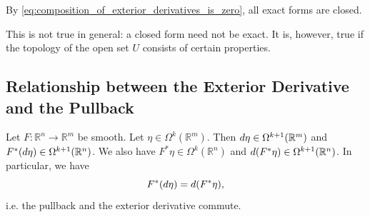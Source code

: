 \documentclass[notoc,notitlepage]{tufte-book}
\begin{document}
\begin{note}
  By \cref{eq:composition_of_exterior_derivatives_is_zero}, all exact forms are closed.

  This is not true in general: a closed form need not be exact. It is, however, true if
  the topology of the open set $U$ consists of certain properties.
\end{note}

\subsection{Relationship between the Exterior Derivative and the Pullback}%
\label{sub:relationship_between_the_exterior_derivative_and_the_pullback}

\begin{propo}\label{propo:commutativity_of_the_pullback_and_the_exterior_derivative}
  Let $F : \mathbb{R}^n \to \mathbb{R}^m$ be smooth. Let $\eta \in
  \Omega^k(\mathbb{R}^m)$. Then $\mathop{}\!d{\eta} \in \Omega^{k + 1}(\mathbb{R}^m)$ and $F^*
  (\mathop{}\!d{\eta}) \in \Omega^{k + 1}(\mathbb{R}^n)$. We also have $F^* \eta \in
  \Omega^k(\mathbb{R}^n)$ and $\mathop{}\!d{(F^* \eta)} \in \Omega^{k + 1}(\mathbb{R}^n)$. In
  particular, we have
  \begin{equation*}
    F^* (\mathop{}\!d{\eta}) = \mathop{}\!d{(F^* \eta)},
  \end{equation*}
  i.e. the pullback and the exterior derivative commute.
\end{propo}
\end{document}
